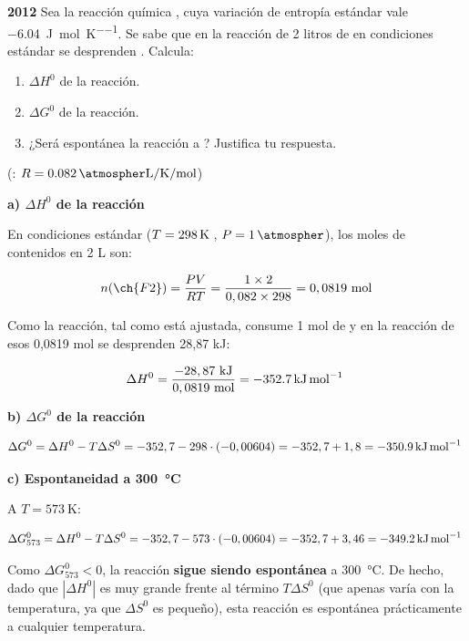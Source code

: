 \begin{exerciseEVAU}
    \textbf{2012} Sea la reacción química , cuya variación de entropía estándar vale \SI{-6,04}{\joule\per\mole\per\kelvin}. Se sabe que en la reacción de 2 litros de  en condiciones estándar se desprenden . Calcula:
    \begin{enumerate}[label=\letraminuscula]
    \item \(\Delta H^0\) de la reacción.
    \item \(\Delta G^0\) de la reacción.
    \item ¿Será espontánea la reacción a ? Justifica tu respuesta.
    \end{enumerate}
    (\datos{}:  \(R = \ctegases\))

    \begin{solu}

        \textbf{a) \(\Delta H^0\) de la reacción}

        En condiciones estándar (\(T = \temperatura[k]{298}\), \(P = \SI{1}{\atmospher}\)), los moles de  contenidos en 2 L son:

        \begin{equation*}
            n(\ch{F2}) = \dfrac{PV}{RT} = \dfrac{1 \times 2}{0,082 \times 298} = 0,0819 \ \text{mol}
        \end{equation*}

        Como la reacción, tal como está ajustada, consume 1 mol de  y en la reacción de esos 0,0819 mol se desprenden 28,87 kJ:

        \begin{equation*}
            \Delta H^0 = \dfrac{-28,87 \ \si{\kilo\joule}}{0,0819 \ \text{mol}} = \energia[kjmol]{-352.7}
        \end{equation*}

        \textbf{b) \(\Delta G^0\) de la reacción}

        \begin{equation*}
            \Delta G^0 = \Delta H^0 - T \Delta S^0 = -352,7 - 298 \cdot (-0,00604) = -352,7 + 1,8 = \energia[kjmol]{-350.9}
        \end{equation*}

        \textbf{c) Espontaneidad a \SI{300}{\celsius}}

        A \(T = \SI{573}{\kelvin}\):

        \begin{equation*}
            \Delta G^0_{573} = \Delta H^0 - T \Delta S^0 = -352,7 - 573 \cdot (-0,00604) = -352,7 + 3,46 = \energia[kjmol]{-349.2}
        \end{equation*}

        Como \(\Delta G^0_{573} < 0\), la reacción \textbf{sigue siendo espontánea} a \SI{300}{\celsius}. De hecho, dado que \(|\Delta H^0|\) es muy grande frente al término \(T\Delta S^0\) (que apenas varía con la temperatura, ya que \(\Delta S^0\) es pequeño), esta reacción es espontánea prácticamente a cualquier temperatura.

    \end{solu}
\end{exerciseEVAU}

